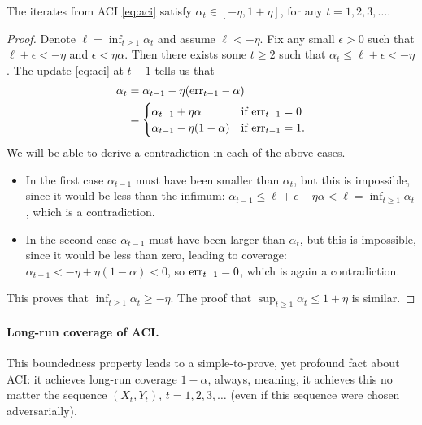 \documentclass{article}
\begin{document}
\begin{lemma}
\label{lem:aci_bounded}
The iterates from ACI \eqref{eq:aci} satisfy $\alpha_t \in [-\eta, 1+\eta]$, for
any $t=1,2,3,\ldots$.  
\end{lemma}

\begin{proof}
Denote $\ell = \inf_{t \geq 1} \alpha_t$ and assume $\ell < -\eta$. Fix any
small $\epsilon>0$ such that $\ell + \epsilon < -\eta$ and $\epsilon <
\eta\alpha$. Then there exists some $t \geq 2$ such that $\alpha_t  \leq \ell +
\epsilon < -\eta$. The update \eqref{eq:aci} at $t-1$ tells us that 
\begin{align*}
\alpha_t &= \alpha_{t-1} - \eta(\mathrm{err}_{t-1} - \alpha) \\
&= \begin{cases} 
\alpha_{t-1} + \eta\alpha & \text{if $\mathrm{err}_{t-1} = 0$} \\ 
\alpha_{t-1} - \eta(1-\alpha) & \text{if $\mathrm{err}_{t-1} = 1$}. 
\end{cases}
\end{align*}
We will be able to derive a contradiction in each of the above cases. 
\begin{itemize}
\item In the first case $\alpha_{t-1}$ must have been smaller than $\alpha_t$,
  but this is impossible, since it would be less than the infimum:
  $\alpha_{t-1} \leq \ell + \epsilon - \eta\alpha < \ell = \inf_{t \geq 1}
  \alpha_t$, which is a contradiction.           
\item In the second case $\alpha_{t-1}$ must have been larger than $\alpha_t$,
  but this is impossible, since it would be less than zero, leading to coverage: 
  $\alpha_{t-1} <  -\eta + \eta(1-\alpha) < 0$, so $\mathrm{err}_{t-1}=0$, which is
  again a contradiction.        
\end{itemize}
This proves that $\inf_{t \geq 1} \alpha_t \geq -\eta$. The proof that $\sup_{t
  \geq 1} \alpha_t \leq 1+\eta$ is similar.      
\end{proof}

\paragraph{Long-run coverage of ACI.}

This boundedness property leads to a simple-to-prove, yet profound fact about
ACI: it achieves long-run coverage $1-\alpha$, always, meaning, it achieves this
no matter the sequence $(X_t,Y_t)$, $t=1,2,3,\ldots$ (even if this sequence were
chosen adversarially).  
\end{document}

